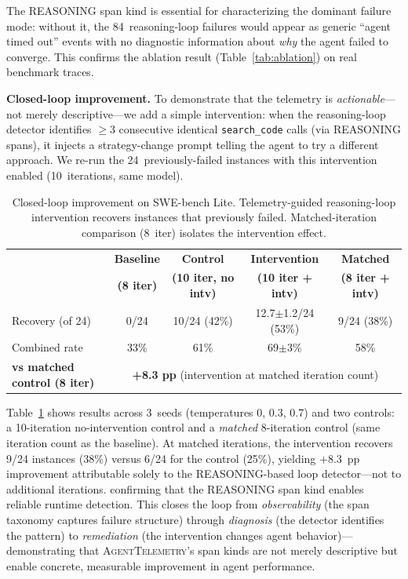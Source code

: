 \documentclass[sigplan,10pt,screen]{acmart}
\begin{document}
\noindent
The REASONING span kind is essential for characterizing the dominant
failure mode: without it, the 84~reasoning-loop failures would appear
as generic ``agent timed out'' events with no diagnostic information
about \emph{why} the agent failed to converge.  This confirms the
ablation result (Table~\ref{tab:ablation}) on real benchmark traces.

\textbf{Closed-loop improvement.}
To demonstrate that the telemetry is \emph{actionable}---not merely
descriptive---we add a simple intervention: when the reasoning-loop
detector identifies $\geq$3 consecutive identical \texttt{search\_code}
calls (via REASONING spans), it injects a strategy-change prompt
telling the agent to try a different approach.  We re-run the
24~previously-failed instances with this intervention enabled
(10~iterations, same model).

\begin{table}[t]
\centering
\small
\caption{Closed-loop improvement on SWE-bench Lite.  Telemetry-guided
reasoning-loop intervention recovers instances that previously failed.
Matched-iteration comparison (8~iter) isolates the intervention effect.}
\label{tab:closed-loop}
\begin{tabular}{@{}lcccc@{}}
\toprule
& \textbf{Baseline} & \textbf{Control} & \textbf{Intervention} & \textbf{Matched} \\
& \textbf{(8 iter)} & \textbf{(10 iter, no intv)} & \textbf{(10 iter + intv)} & \textbf{(8 iter + intv)} \\
\midrule
Recovery (of 24)   & 0/24  & 10/24 (42\%) & 12.7$\pm$1.2/24 (53\%) & 9/24 (38\%) \\
Combined rate      & 33\%  & 61\%        & 69$\pm$3\%   & 58\% \\
\midrule
\textbf{vs matched control (8 iter)} & \multicolumn{4}{c}{\textbf{+8.3 pp} (intervention at matched iteration count)} \\
\bottomrule
\end{tabular}
\end{table}

\noindent
Table~\ref{tab:closed-loop} shows results across 3~seeds (temperatures
0, 0.3, 0.7) and two controls: a 10-iteration no-intervention control
and a \emph{matched} 8-iteration control (same iteration count as the baseline).
At matched iterations, the intervention recovers 9/24 instances (38\%)
versus 6/24 for the control (25\%), yielding $+8.3$~pp improvement
attributable solely to the REASONING-based loop detector---not to
additional iterations.
confirming that the REASONING span kind enables reliable runtime
detection.  This closes the loop from \emph{observability}
(the span taxonomy captures failure structure) through \emph{diagnosis}
(the detector identifies the pattern) to \emph{remediation}
(the intervention changes agent behavior)---demonstrating that
\textsc{AgentTelemetry}'s span kinds are not merely descriptive but
enable concrete, measurable improvement in agent performance.
\end{document}
